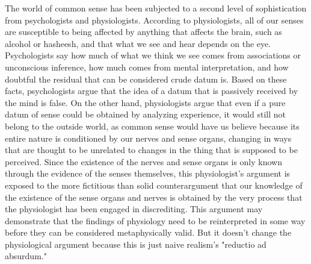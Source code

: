 \documentclass[a4paper,12pt]{book}[2004/02/16]
\theoremstyle{ilemma}
\theoremstyle{itheorem}
\theoremstyle{iother}
\theoremstyle{icorollary}
\theoremstyle{numcorollary}
\theoremstyle{idefinition}
\begin{document}
The world of common sense has been subjected to a second level of sophistication from psychologists and physiologists. According to physiologists, all of our senses are susceptible to being affected by anything that affects the brain, such as alcohol or hasheesh, and that what we see and hear depends on the eye. Psychologists say how much of what we think we see comes from associations or unconscious inference, how much comes from mental interpretation, and how doubtful the residual that can be considered crude datum is. Based on these facts, psychologists argue that the idea of a datum that is passively received by the mind is false. On the other hand, physiologists argue that even if a pure datum of sense could be obtained by analyzing experience, it would still not belong to the outside world, as common sense would have us believe because its entire nature is conditioned by our nerves and sense organs, changing in ways that are thought to be unrelated to changes in the thing that is supposed to be perceived. Since the existence of the nerves and sense organs is only known through the evidence of the senses themselves, this physiologist's argument is exposed to the more fictitious than solid counterargument that our knowledge of the existence of the sense organs and nerves is obtained by the very process that the physiologist has been engaged in discrediting. This argument may demonstrate that the findings of physiology need to be reinterpreted in some way before they can be considered metaphysically valid. But it doesn't change the physiological argument because this is just naive realism's "reductio ad absurdum."
\end{document}
